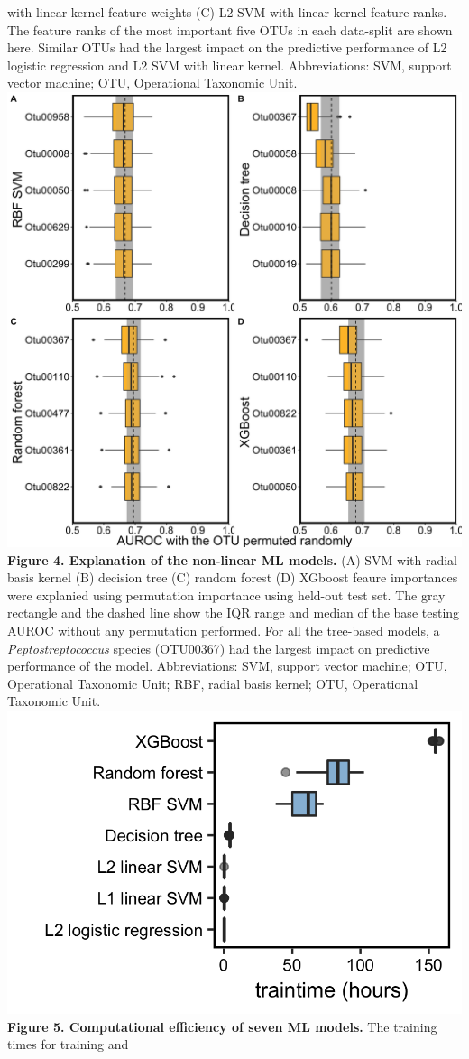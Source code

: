 \documentclass[11pt,]{article}
\begin{document}
with linear kernel feature weights (C) L2 SVM with linear kernel feature
ranks. The feature ranks of the most important five OTUs in each
data-split are shown here. Similar OTUs had the largest impact on the
predictive performance of L2 logistic regression and L2 SVM with linear
kernel. Abbreviations: SVM, support vector machine; OTU, Operational
Taxonomic Unit. \newpage
\includegraphics{Figure_4.png} \textbf{Figure 4. Explanation of the
non-linear ML models.} (A) SVM with radial basis kernel (B) decision
tree (C) random forest (D) XGboost feaure importances were explanied
using permutation importance using held-out test set. The gray rectangle
and the dashed line show the IQR range and median of the base testing
AUROC without any permutation performed. For all the tree-based models,
a \emph{Peptostreptococcus} species (OTU00367) had the largest impact on
predictive performance of the model. Abbreviations: SVM, support vector
machine; OTU, Operational Taxonomic Unit; RBF, radial basis kernel; OTU,
Operational Taxonomic Unit. \newpage
\includegraphics{Figure_5.png} \textbf{Figure 5. Computational
efficiency of seven ML models.} The training times for training and
\end{document}
